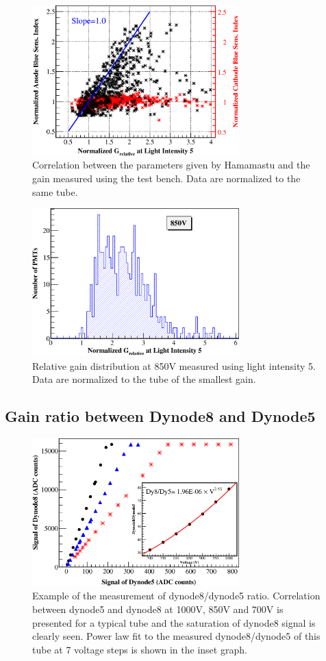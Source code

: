 \documentclass[review, times]{elsarticle}
\begin{document}
\begin{figure}
 \centering
 \includegraphics[width=80mm]{correlation_new}
\caption{Correlation between the parameters given by Hamamastu and the gain measured using the test bench.
Data are normalized to the same tube.}
\label{fig:gain_correlation}
\end{figure} 

\begin{figure}
 \centering
 \includegraphics[width=80mm]{GainDist}
\caption{Relative gain distribution at 850V measured using light intensity 5.
Data are normalized to the tube of the smallest gain.}
\label{fig:gain_dist}
\end{figure}

\subsection{Gain ratio between Dynode8 and Dynode5}
\label{sec:psd_dy58}

\begin{figure}
 \centering
 \includegraphics[width=80mm]{dy58_example}
\caption{Example of the measurement of dynode8/dynode5 ratio.
Correlation between dynode5 and dynode8 at 1000V, 850V and 700V is presented for a typical tube and the saturation of dynode8 signal is clearly seen.
Power law fit to the measured dynode8/dynode5 of this tube at 7 voltage steps is shown in the inset graph.
}
\label{fig:dy58_example}
\end{figure} 
\end{document}

